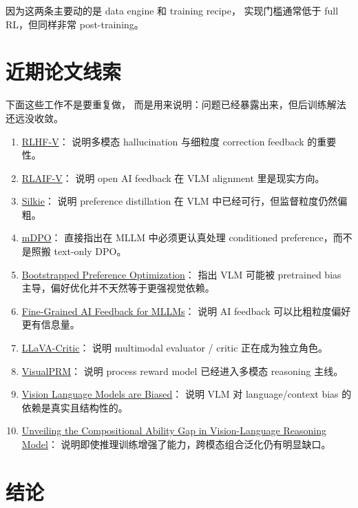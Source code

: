 \documentclass[12pt,a4paper]{article}
\begin{document}
因为这两条主要动的是 data engine 和 training recipe，
实现门槛通常低于 full RL，但同样非常 post-training。

\section*{近期论文线索}

下面这些工作不是要重复做，
而是用来说明：问题已经暴露出来，但后训练解法还远没收敛。

\begin{enumerate}[leftmargin=2em]
  \item \href{https://arxiv.org/abs/2312.00849}{RLHF-V}：
    说明多模态 hallucination 与细粒度 correction feedback 的重要性。
  \item \href{https://arxiv.org/abs/2405.17220}{RLAIF-V}：
    说明 open AI feedback 在 VLM alignment 里是现实方向。
  \item \href{https://arxiv.org/abs/2312.10665}{Silkie}：
    说明 preference distillation 在 VLM 中已经可行，但监督粒度仍然偏粗。
  \item \href{https://arxiv.org/abs/2406.11839}{mDPO}：
    直接指出在 MLLM 中必须更认真处理 conditioned preference，而不是照搬 text-only DPO。
  \item \href{https://arxiv.org/abs/2403.08730}{Bootstrapped Preference Optimization}：
    指出 VLM 可能被 pretrained bias 主导，偏好优化并不天然等于更强视觉依赖。
  \item \href{https://arxiv.org/abs/2404.14233}{Fine-Grained AI Feedback for MLLMs}：
    说明 AI feedback 可以比粗粒度偏好更有信息量。
  \item \href{https://arxiv.org/abs/2410.02712}{LLaVA-Critic}：
    说明 multimodal evaluator / critic 正在成为独立角色。
  \item \href{https://arxiv.org/abs/2503.10291}{VisualPRM}：
    说明 process reward model 已经进入多模态 reasoning 主线。
  \item \href{https://arxiv.org/abs/2505.23941}{Vision Language Models are Biased}：
    说明 VLM 对 language/context bias 的依赖是真实且结构性的。
  \item \href{https://arxiv.org/abs/2505.19406}{Unveiling the Compositional Ability Gap in Vision-Language Reasoning Model}：
    说明即使推理训练增强了能力，跨模态组合泛化仍有明显缺口。
\end{enumerate}

\section*{结论}
\end{document}
